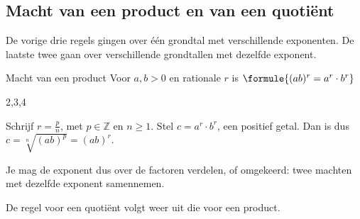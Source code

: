 \begin{oefeningen}
\end{oefeningen}

\subsection{Macht van een product en van een quotiënt}

De vorige drie regels gingen over één grondtal met verschillende exponenten. De laatste twee gaan over verschillende grondtallen met dezelfde exponent.

\begin{theorie}
\begin{stelling}{Macht van een product}
Voor $a, b > 0$ en rationale $r$ is \qquad $\formule{(ab)^r = a^r \cdot b^r}$
\end{stelling}
\begin{alleenvoor}{2,3,4}
\begin{bewijs}
Schrijf $r = \frac{p}{n}$, met $p \in \mathbb{Z}$ en $n \geqslant 1$. Stel $c = a^r \cdot b^r$, een positief getal. Dan is
dus $c = \sqrt[n]{(ab)^p} = (ab)^r$.
\end{bewijs}
\end{alleenvoor}
\end{theorie}

Je mag de exponent dus over de factoren verdelen, of omgekeerd: twee machten met dezelfde exponent samennemen.


\begin{oefeningen}
\end{oefeningen}

De regel voor een quotiënt volgt weer uit die voor een product.

